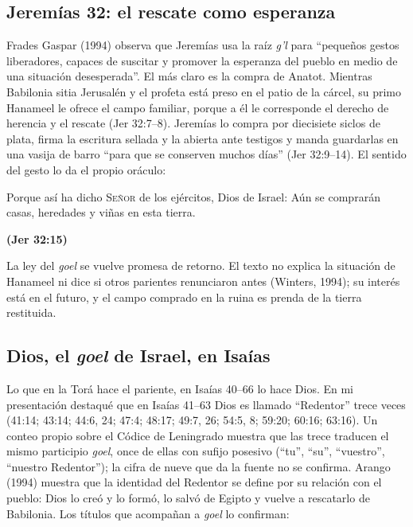 \documentclass[11pt,letterpaper]{article}
\newcommand{\SENOR}{\textsc{Señor}}
\newcommand{\fuente}[1]{\par\hfill{\upshape\bfseries\small\textcolor{tierraroja}{#1}}}
\begin{document}
\subsection{Jeremías 32: el rescate como esperanza}
Frades Gaspar (1994) observa que Jeremías usa la raíz \emph{g'l} para ``pequeños gestos liberadores, capaces de suscitar y promover la esperanza del pueblo en medio de una situación desesperada''. El más claro es la compra de Anatot. Mientras Babilonia sitia Jerusalén y el profeta está preso en el patio de la cárcel, su primo Hanameel le ofrece el campo familiar, porque a él le corresponde el derecho de herencia y el rescate (Jer 32:7--8). Jeremías lo compra por diecisiete siclos de plata, firma la escritura sellada y la abierta ante testigos y manda guardarlas en una vasija de barro ``para que se conserven muchos días'' (Jer 32:9--14). El sentido del gesto lo da el propio oráculo:

\begin{cita}Porque así ha dicho \SENOR{} de los ejércitos, Dios de Israel: Aún se comprarán casas, heredades y viñas en esta tierra.\fuente{(Jer 32:15)}\end{cita}

La ley del \emph{goel} se vuelve promesa de retorno. El texto no explica la situación de Hanameel ni dice si otros parientes renunciaron antes (Winters, 1994); su interés está en el futuro, y el campo comprado en la ruina es prenda de la tierra restituida.

\subsection{Dios, el \emph{goel} de Israel, en Isaías}
Lo que en la Torá hace el pariente, en Isaías 40--66 lo hace Dios. En mi presentación destaqué que en Isaías 41--63 Dios es llamado ``Redentor'' trece veces (41:14; 43:14; 44:6, 24; 47:4; 48:17; 49:7, 26; 54:5, 8; 59:20; 60:16; 63:16). Un conteo propio sobre el Códice de Leningrado muestra que las trece traducen el mismo participio \emph{goel}, once de ellas con sufijo posesivo (``tu'', ``su'', ``vuestro'', ``nuestro Redentor''); la cifra de nueve que da la fuente no se confirma. Arango (1994) muestra que la identidad del Redentor se define por su relación con el pueblo: Dios lo creó y lo formó, lo salvó de Egipto y vuelve a rescatarlo de Babilonia. Los títulos que acompañan a \emph{goel} lo confirman:
\end{document}
